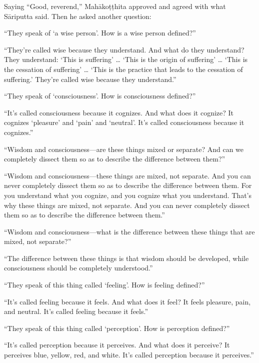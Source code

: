 \documentclass[12pt,openany]{book}%
\begin{document}
Saying “Good, reverend,” \textsanskrit{Mahākoṭṭhita} approved and agreed with what \textsanskrit{Sāriputta} said. Then he asked another question: 

“They speak of ‘a wise person’. How is a wise person defined?” 

“They’re called wise because they understand. And what do they understand? They understand: ‘This is suffering’ … ‘This is the origin of suffering’ … ‘This is the cessation of suffering’ … ‘This is the practice that leads to the cessation of suffering.’ They’re called wise because they understand.” 

“They speak of ‘consciousness’. How is consciousness defined?” 

“It’s called consciousness because it cognizes. And what does it cognize? It cognizes ‘pleasure’ and ‘pain’ and ‘neutral’. It’s called consciousness because it cognizes.” 

“Wisdom and consciousness—are these things mixed or separate? And can we completely dissect them so as to describe the difference between them?” 

“Wisdom and consciousness—these things are mixed, not separate. And you can never completely dissect them so as to describe the difference between them. For you understand what you cognize, and you cognize what you understand. That’s why these things are mixed, not separate. And you can never completely dissect them so as to describe the difference between them.” 

“Wisdom and consciousness—what is the difference between these things that are mixed, not separate?” 

“The difference between these things is that wisdom should be developed, while consciousness should be completely understood.” 

“They speak of this thing called ‘feeling’. How is feeling defined?” 

“It’s called feeling because it feels. And what does it feel? It feels pleasure, pain, and neutral. It’s called feeling because it feels.” 

“They speak of this thing called ‘perception’. How is perception defined?” 

“It’s called perception because it perceives. And what does it perceive? It perceives blue, yellow, red, and white. It’s called perception because it perceives.” 
\end{document}
